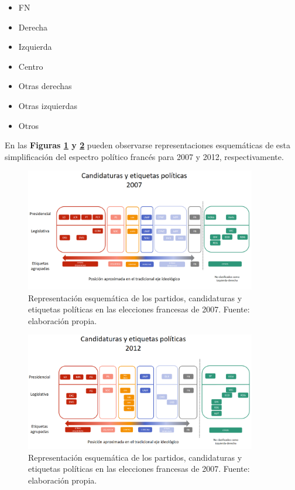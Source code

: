 \begin{itemize}
\item FN
\item Derecha
\item Izquierda
\item Centro
\item Otras derechas
\item Otras izquierdas
\item Otros
\end{itemize}

En las \textbf{Figuras \ref{fig:Partidos_07} y \ref{fig:Partidos_12}} pueden observarse representaciones esquemáticas de esta simplificación del espectro político francés para 2007 y 2012, respectivamente.\\

\begin{figure}[h]
	\centering
	\includegraphics[width = 0.9\textwidth]{Figs/FN_Francia/Partidos_07}
	\caption{Representación esquemática de los partidos, candidaturas y etiquetas políticas en las elecciones francesas de 2007. Fuente: elaboración propia.}
	\label{fig:Partidos_07}	
\end{figure}

\begin{figure}[h]
	\centering
	\includegraphics[width = 0.9\textwidth]{Figs/FN_Francia/Partidos_12}
	\caption{Representación esquemática de los partidos, candidaturas y etiquetas políticas en las elecciones francesas de 2007. Fuente: elaboración propia.}
	\label{fig:Partidos_12}	
\end{figure}

